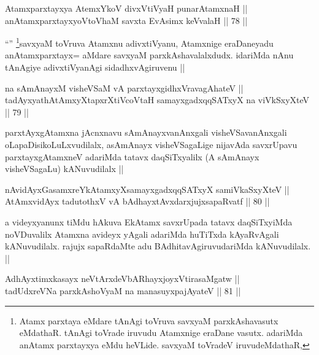 
\begin{shl}
Atamxparxtayxya AtemxYkoV divxVtiVyaH punarAtamxnaH || \\
anAtamxparxtayxyoV\s toV\s haM savxta EvAsimx keVvalaH ||  78 ||  
\end{shl}

\begin{artha}
``\stext'' \footnote{Atamx parxtaya eMdare tAnAgi toVruva savxyaM parxkAshavasutx eMdathaR. tAnAgi toVrade iruvudu Atamxnige eraDane vasutx. adariMda anAtamx parxtayxya eMdu heVLide. savxyaM toVradeV iruvudeMdathaR,}savxyaM toVruva Atamxnu adivxtiVyanu, Atamxnige eraDaneyadu anAtamxparxtayx= aMdare savxyaM parxkAshavalalxdudx. idariMda nAnu tAnAgiye adivxtiVyanAgi sidadhxvAgiruvenu ||
\end{artha}


\begin{shl}
na sAmAnayxM visheVSaM vA parxtayxgidhxVravagAhateV || \\
tadAyxyathAtAmxyXtapxrXtiVcoV\s taH samayxgadxqqSATxyX na viVkSxyXteV ||  79 ||  
\end{shl}

\begin{artha}
parxtAyxgAtamxna jAcnxnavu sAmAnayxvanAnxgali visheVSavanAnxgali oLapaDisikoLuLxvudilalx, asAmAnayx visheVSagaLige nijavAda savxrUpavu parxtayxgAtamxneV adariMda tatavx daqSiTxyalilx (A sAmAnayx visheVSagaLu) kANuvudilalx ||
\end{artha}


\begin{shl}
nAvidAyxGasamxreYkAtamxyXsamayxgadxqqSATxyX samiVkaSxyXteV || \\
AtAmxvidAyx tadutothxV vA bAdhayxtAvxdarxjujxsapaRvatf ||  80 ||  
\end{shl}

\begin{artha}
a videyxyanunx tiMdu hAkuva EkAtamx savxrUpada tatavx daqSiTxyiMda noVDuvalilx Atamxna avideyx yAgali adariMda huTiTxda kAyaRvAgali kANuvudilalx. rajujx sapaRdaMte adu BAdhitavAgiruvudariMda kANuvudilalx. ||
\end{artha}


\begin{shl}
AdhAyxtimxkasayx neVtArxdeVbARhayxjoyxVtirasaMgatw || \\
tadUdxreVNa parxkAshoV\s yaM na manasuyxpajAyateV ||  81 ||  
\end{shl}

